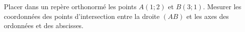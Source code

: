 
\begin{exercice}\label{exosmath-0481}

    Placer dans un repère orthonormé les points \( A(1;2)\) et \( B(3;1)\). Mesurer les coordonnées des points d'intersection entre la droite \( (AB)\) et les axes des ordonnées et des abscisses. 

\end{exercice}
